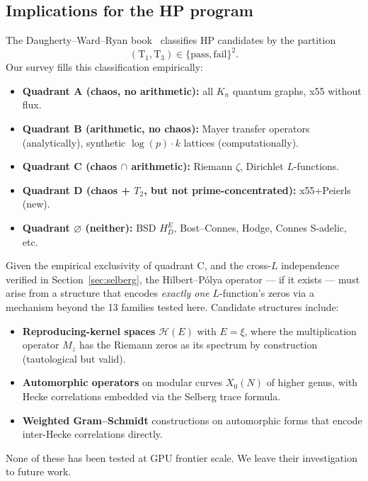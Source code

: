 \documentclass[11pt,a4paper]{article}
\begin{document}
\subsection{Implications for the HP program}

The Daugherty--Ward--Ryan book~\cite{book-ch3} classifies HP candidates
by the partition
\[
  (\text{T}_1, \text{T}_3) \in \{\text{pass}, \text{fail}\}^2.
\]
Our survey fills this classification empirically:

\begin{itemize}[nosep]
\item \textbf{Quadrant A (chaos, no arithmetic):} all $K_n$ quantum
      graphs, x55 without flux.
\item \textbf{Quadrant B (arithmetic, no chaos):} Mayer transfer
      operators (analytically), synthetic $\log(p){\cdot}k$ lattices
      (computationally).
\item \textbf{Quadrant C (chaos $\cap$ arithmetic):} Riemann
      $\zeta$, Dirichlet $L$-functions.
\item \textbf{Quadrant D (chaos + $T_2$, but not prime-concentrated):}
      x55+Peierls (new).
\item \textbf{Quadrant $\varnothing$ (neither):} BSD $H_D^E$,
      Bost--Connes, Hodge, Connes S-adelic, etc.
\end{itemize}

Given the empirical exclusivity of quadrant C, and the cross-$L$
independence verified in Section~\ref{sec:selberg}, the Hilbert--P\'olya
operator — if it exists — must arise from a structure that
encodes \emph{exactly one} $L$-function's zeros via a mechanism
beyond the 13 families tested here. Candidate structures include:

\begin{itemize}[nosep]
\item \textbf{Reproducing-kernel spaces} $\mathcal H(E)$ with
      $E = \xi$, where the multiplication operator $M_z$ has the
      Riemann zeros as its spectrum by construction (tautological but
      valid).
\item \textbf{Automorphic operators} on modular curves $X_0(N)$ of
      higher genus, with Hecke correlations embedded via the
      Selberg trace formula.
\item \textbf{Weighted Gram--Schmidt} constructions on automorphic
      forms that encode inter-Hecke correlations directly.
\end{itemize}

None of these has been tested at GPU frontier scale. We leave their
investigation to future work.
\end{document}
